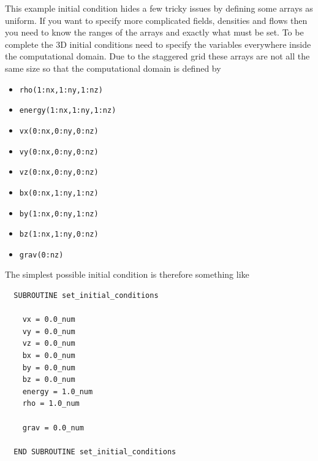 \documentclass[11pt]{article}
\begin{document}
This example initial condition hides a few tricky issues by defining some arrays as uniform. If you want to specify more complicated fields, densities and flows then you need to know the ranges of the arrays and exactly what must be set. To be complete the 3D initial conditions need to specify the variables everywhere inside the computational domain. Due to the staggered grid these arrays are not all the same size so that the computational domain is defined by
\begin{itemize}
\item \texttt{rho(1:nx,1:ny,1:nz)}
\item \texttt{energy(1:nx,1:ny,1:nz)}
\item \texttt{vx(0:nx,0:ny,0:nz)}
\item \texttt{vy(0:nx,0:ny,0:nz)}
\item \texttt{vz(0:nx,0:ny,0:nz)}
\item \texttt{bx(0:nx,1:ny,1:nz)}
\item \texttt{by(1:nx,0:ny,1:nz)}
\item \texttt{bz(1:nx,1:ny,0:nz)}
\item \texttt{grav(0:nz)}  
\end{itemize}              

The simplest possible initial condition is therefore something like
\begin{verbatim}
  SUBROUTINE set_initial_conditions

    vx = 0.0_num
    vy = 0.0_num
    vz = 0.0_num
    bx = 0.0_num
    by = 0.0_num
    bz = 0.0_num
    energy = 1.0_num
    rho = 1.0_num

    grav = 0.0_num

  END SUBROUTINE set_initial_conditions  
\end{verbatim}  
\end{document}
